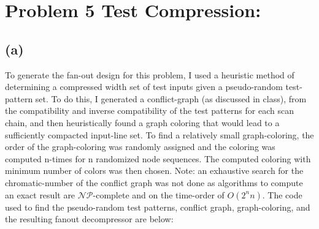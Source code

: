 \documentclass[letterpaper]{article} %
\begin{document}
\newpage

\section*{Problem 5 {\small Test Compression:}}
\subsection*{(a)}
\hspace{0.5cm}To generate the fan-out design for this problem, I used a heuristic method of determining a compressed width set of test inputs given a pseudo-random test-pattern set. To do this, I generated a conflict-graph (as discussed in class), from the compatibility and inverse compatibility of the test patterns for each scan chain, and then heuristically found a graph coloring that would lead to a sufficiently compacted input-line set. To find a relatively small graph-coloring, the order of the graph-coloring was randomly assigned and the coloring was computed n-times for n randomized node sequences. The computed coloring with minimum number of colors was then chosen. Note: an exhaustive search for the chromatic-number of the conflict graph was not done as algorithms to compute an exact result are $\mathcal{NP}$-complete and on the time-order of $O(2^{n}n)$. The code used to find the pseudo-random test patterns, conflict graph, graph-coloring, and the resulting fanout decompressor are below:
\end{document}
